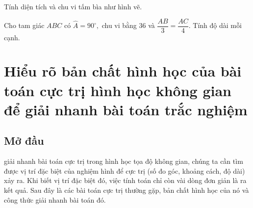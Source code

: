 \begin{bt}%
Tính diện tích và chu vi tấm bìa như hình vẽ.
\begin{center}\end{center}

\end{bt}
\begin{bt}%
Cho tam giác $ABC$ có $\widehat{A}=90^\circ,$ chu vi bằng $36$ và $\dfrac{AB}{3}=\dfrac{AC}{4}.$ Tính độ dài mỗi cạnh.
\end{bt}

\setcounter{bt}{0}
\setcounter{vd}{0}
\section{Hiểu rõ bản chất hình học của bài toán cực trị hình học không gian để giải nhanh bài toán trắc nghiệm}
\begin{center}
\textbf{\color{violet}{Võ Trọng Trí\\
(GV THPT Anh Sơn 1, Nghệ An)}}
\end{center}
\subsection*{Mở đầu}
 giải nhanh bài toán cực trị trong hình học tọa độ không gian, chúng ta cần tìm được vị trí đặc biệt của nghiệm hình để cực trị (số đo góc, khoảng cách, độ dài) xảy ra. Khi biết vị trí đặc biệt đó, việc tính toán chỉ còn vài dòng đơn giản là ra kết quả. Sau đây là các bài toán cực trị thường gặp, bản chất hình học của nó và công thức giải nhanh bài toán đó.

